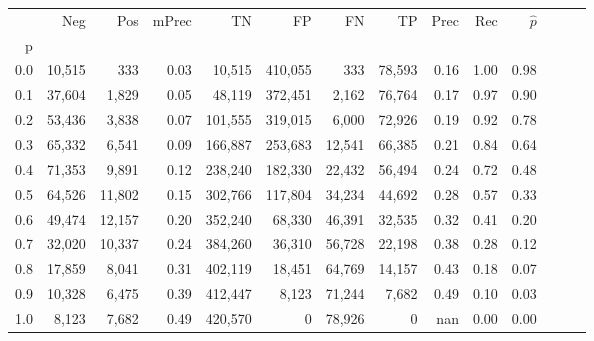 \begin{tabular}{rrrrrrrrrrrrrr}
\toprule
{} &     Neg &     Pos & mPrec &       TN &       FP &      FN &      TP &  Prec &   Rec & $\hat{p}$ \\
p   &         &         &       &          &          &         &         &       &       &           \\
\midrule
0.0 &  10,515 &     333 &  0.03 &   10,515 &  410,055 &     333 &  78,593 &  0.16 &  1.00 &      0.98 \\
0.1 &  37,604 &   1,829 &  0.05 &   48,119 &  372,451 &   2,162 &  76,764 &  0.17 &  0.97 &      0.90 \\
0.2 &  53,436 &   3,838 &  0.07 &  101,555 &  319,015 &   6,000 &  72,926 &  0.19 &  0.92 &      0.78 \\
0.3 &  65,332 &   6,541 &  0.09 &  166,887 &  253,683 &  12,541 &  66,385 &  0.21 &  0.84 &      0.64 \\
0.4 &  71,353 &   9,891 &  0.12 &  238,240 &  182,330 &  22,432 &  56,494 &  0.24 &  0.72 &      0.48 \\
0.5 &  64,526 &  11,802 &  0.15 &  302,766 &  117,804 &  34,234 &  44,692 &  0.28 &  0.57 &      0.33 \\
0.6 &  49,474 &  12,157 &  0.20 &  352,240 &   68,330 &  46,391 &  32,535 &  0.32 &  0.41 &      0.20 \\
0.7 &  32,020 &  10,337 &  0.24 &  384,260 &   36,310 &  56,728 &  22,198 &  0.38 &  0.28 &      0.12 \\
0.8 &  17,859 &   8,041 &  0.31 &  402,119 &   18,451 &  64,769 &  14,157 &  0.43 &  0.18 &      0.07 \\
0.9 &  10,328 &   6,475 &  0.39 &  412,447 &    8,123 &  71,244 &   7,682 &  0.49 &  0.10 &      0.03 \\
1.0 &   8,123 &   7,682 &  0.49 &  420,570 &        0 &  78,926 &       0 &   nan &  0.00 &      0.00 \\
\bottomrule
\end{tabular}
